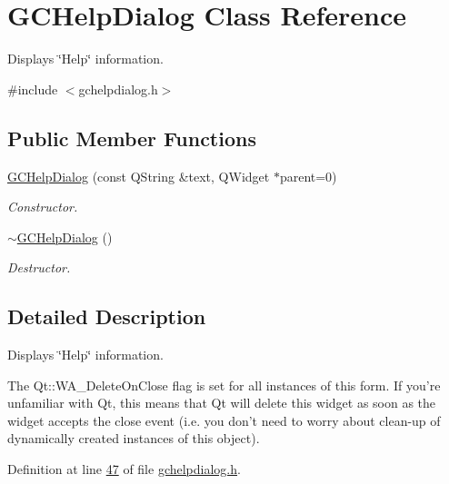 \hypertarget{class_g_c_help_dialog}{\section{\-G\-C\-Help\-Dialog \-Class \-Reference}
\label{class_g_c_help_dialog}
}


\-Displays \char`\"{}\-Help\char`\"{} information.  




{\ttfamily \#include $<$gchelpdialog.\-h$>$}

\subsection*{\-Public \-Member \-Functions}
\begin{DoxyCompactItemize}
\item 
\hyperlink{class_g_c_help_dialog_ab50a71cb98a1d9375288703bcd1e3be1}{\-G\-C\-Help\-Dialog} (const \-Q\-String \&text, \-Q\-Widget $\ast$parent=0)
\begin{DoxyCompactList}\small\item\em \-Constructor. \end{DoxyCompactList}\item 
\hyperlink{class_g_c_help_dialog_ae8e5aa465ea3bd2fa4d922b0cc09cfdc}{$\sim$\-G\-C\-Help\-Dialog} ()
\begin{DoxyCompactList}\small\item\em \-Destructor. \end{DoxyCompactList}\end{DoxyCompactItemize}


\subsection{\-Detailed \-Description}
\-Displays \char`\"{}\-Help\char`\"{} information. 

\-The \-Qt\-::\-W\-A\-\_\-\-Delete\-On\-Close flag is set for all instances of this form. \-If you're unfamiliar with \-Qt, this means that \-Qt will delete this widget as soon as the widget accepts the close event (i.\-e. you don't need to worry about clean-\/up of dynamically created instances of this object). 

\-Definition at line \hyperlink{gchelpdialog_8h_source_l00047}{47} of file \hyperlink{gchelpdialog_8h_source}{gchelpdialog.\-h}.



